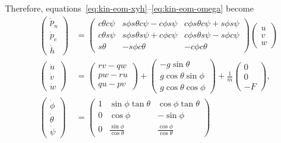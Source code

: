 {Therefore,
equations~\eqref{eq:kin-eom-xyh}--\eqref{eq:kin-eom-omega} become
\begin{align}
\begin{pmatrix} \dot{p}_n \\ \dot{p}_e \\ \dot{h} \end{pmatrix}
&= \begin{pmatrix} c\theta c\psi & s\phi s\theta c\psi - c\phi s\psi
    & c\phi s\theta c\psi + s\phi s\psi \\
    c\theta s\psi &  s\phi s\theta s\psi + c\phi c\psi
    & c\phi s\theta s\psi - s\phi c\psi  \\
    s\theta & -s\phi c\theta & -c\phi c\theta
    \end{pmatrix}
    \begin{pmatrix} u \\ v \\ w \end{pmatrix}
    \label{eq:kin-eom-xyh2} \\
\begin{pmatrix} \dot{u} \\ \dot{v} \\ \dot{w} \end{pmatrix}
&= \begin{pmatrix} rv-qw \\ pw-ru \\ qu-pv \end{pmatrix}
    + \begin{pmatrix}
  -g\sin\theta \\ g\cos\theta\sin\phi \\ g\cos\theta\cos\phi
  \end{pmatrix}+
    \frac{1}{m} \begin{pmatrix} 0 \\ 0 \\ -F \end{pmatrix},
    \label{eq:kin-eom-v2}\\
\begin{pmatrix} \dot{\phi} \\ \dot{\theta} \\ \dot{\psi} \end{pmatrix}
& = \begin{pmatrix}
    1 & \sin\phi\tan\theta & \cos\phi\tan\theta \\
    0 & \cos\phi & -\sin\phi \\
    0 & \frac{\sin\phi}{\cos\theta} & \frac{\cos\phi}{\cos\theta}
    \end{pmatrix}

\end{align}}

